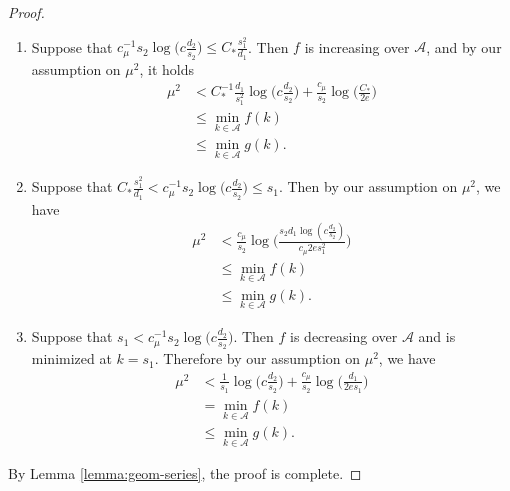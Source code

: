 \documentclass{article}
\newcommand{\cA}{\mathcal{A}}
\newcommand{\Ct}{C_{*}}
\theoremstyle{remark}
\begin{document}
\begin{proof}
    \begin{enumerate}
        \item Suppose that $c_\mu^{-1}s_2\log\big(c\frac{d_2}{s_2}\big) \leq \Ct \frac{s_1^2}{d_1}$. Then $f$ is increasing over $\mathcal{A}$, and by our assumption on $\mu^2$, it holds
        \begin{align*}\mu^2 &< \Ct^{-1}\frac{d_1}{s_1^2}\log\Big(c \frac{d_2}{s_2}\Big) + \frac{c_\mu}{s_2}\log\Big(\frac{\Ct}{2e}\Big) \\
        &\leq \min_{k \in \cA}f(k) \\
        &\leq \min_{k \in \cA}g(k).
        \end{align*}
        \item Suppose that $\Ct \frac{s_1^2}{d_1} < c_\mu^{-1}s_2\log\big(c\frac{d_2}{s_2}\big) \leq s_1$. Then by our assumption on $\mu^2$, we have
        \begin{align*}
            \mu^2 &< \frac{c_\mu}{s_2}\log\Big(\frac{s_2d_1\log(c \frac{d_2}{s_2})}{c_\mu 2e s_1^2}\Big)\\
        &\leq \min_{k \in \cA}f(k) \\
        &\leq \min_{k \in \cA}g(k).
        \end{align*}
        \item Suppose that $s_1 < c_\mu^{-1}s_2\log\big(c\frac{d_2}{s_2}\big)$. Then $f$ is decreasing over $\mathcal{A}$ and is minimized at $k = s_1$. Therefore by our assumption on $\mu^2$, we have 
        \begin{align*}
            \mu^2 &< \frac{1}{s_1}\log\big(c \frac{d_2}{s_2}\big) + \frac{c_\mu}{s_2}\log\big(\frac{d_1}{2es_1}\big)\\
        &= \min_{k \in \cA}f(k) \\
        &\leq \min_{k \in \cA}g(k).
        \end{align*}
    \end{enumerate}
    By Lemma \ref{lemma:geom-series}, the proof is complete.
\end{proof}
\end{document}
